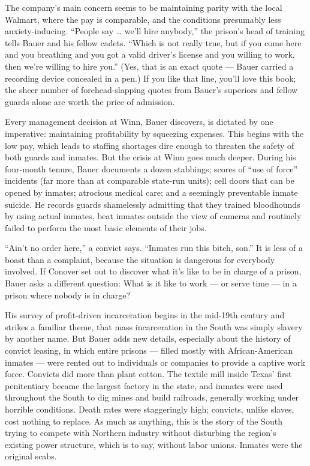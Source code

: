The company's main concern seems to be maintaining parity with the local
Walmart, where the pay is comparable, and the conditions presumably less
anxiety-inducing. ``People say \ldots{} we'll hire anybody,'' the
prison's head of training tells Bauer and his fellow cadets. ``Which is
not really true, but if you come here and you breathing and you got a
valid driver's license and you willing to work, then we're willing to
hire you.'' (Yes, that is an exact quote --- Bauer carried a recording
device concealed in a pen.) If you like that line, you'll love this
book; the sheer number of forehead-slapping quotes from Bauer's
superiors and fellow guards alone are worth the price of admission.

Every management decision at Winn, Bauer discovers, is dictated by one
imperative: maintaining profitability by squeezing expenses. This begins
with the low pay, which leads to staffing shortages dire enough to
threaten the safety of both guards and inmates. But the crisis at Winn
goes much deeper. During his four-month tenure, Bauer documents a dozen
stabbings; scores of ``use of force'' incidents (far more than at
comparable state-run units); cell doors that can be opened by inmates;
atrocious medical care; and a seemingly preventable inmate suicide. He
records guards shamelessly admitting that they trained bloodhounds by
using actual inmates, beat inmates outside the view of cameras and
routinely failed to perform the most basic elements of their jobs.

``Ain't no order here,'' a convict says. ``Inmates run this bitch,
son.'' It is less of a boast than a complaint, because the situation is
dangerous for everybody involved. If Conover set out to discover what
it's like to be in charge of a prison, Bauer asks a different question:
What is it like to work --- or serve time --- in a prison where nobody
is in charge?

His survey of profit-driven incarceration begins in the mid-19th century
and strikes a familiar theme, that mass incarceration in the South was
simply slavery by another name. But Bauer adds new details, especially
about the history of convict leasing, in which entire prisons --- filled
mostly with African-American inmates --- were rented out to individuals
or companies to provide a captive work force. Convicts did more than
plant cotton. The textile mill inside Texas' first penitentiary became
the largest factory in the state, and inmates were used throughout the
South to dig mines and build railroads, generally working under horrible
conditions. Death rates were staggeringly high; convicts, unlike slaves,
cost nothing to replace. As much as anything, this is the story of the
South trying to compete with Northern industry without disturbing the
region's existing power structure, which is to say, without labor
unions. Inmates were the original scabs.


